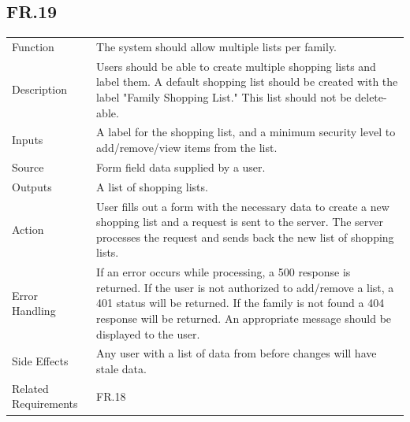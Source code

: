 \documentclass[12pt]{article}
\begin{document}
    \subsection*{FR.19}
    \begin{center}
        \begin{tabular}{| p{10em} p{26em} |}
        \hline
         Function & The system should allow multiple lists per family.\\
         Description & Users should be able to create multiple shopping lists and label them. A default shopping list should be created with the label "Family Shopping List." This list should not be delete-able.\\
         Inputs & A label for the shopping list, and a minimum security level to add/remove/view items from the list.\\
         Source & Form field data supplied by a user.\\
         Outputs & A list of shopping lists.\\
         Action & User fills out a form with the necessary data to create a new shopping list and a request is sent to the server. The server processes the request and sends back the new list of shopping lists.\\
         Error Handling & If an error occurs while processing, a 500 response is returned. If the user is not authorized to add/remove a list, a 401 status will be returned. If the family is not found a 404 response will be returned. An appropriate message should be displayed to the user.\\
         Side Effects & Any user with a list of data from before changes will have stale data.\\
         Related Requirements & FR.18\\
         \hline
        \end{tabular}
    \end{center}
    
\end{document}
